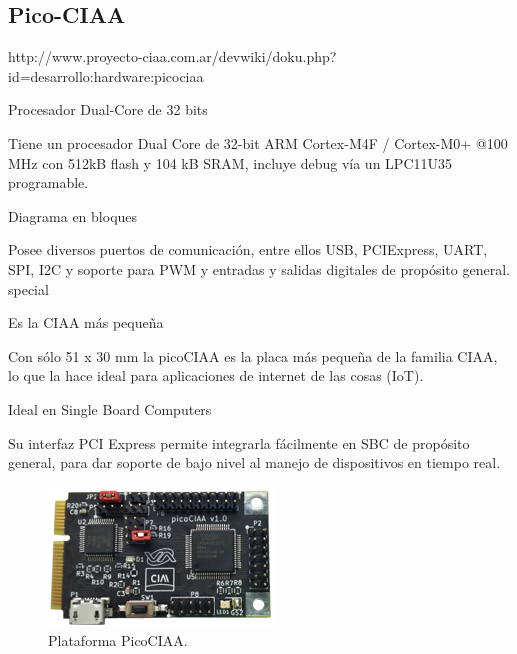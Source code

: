 \medskip 



\subsection{Pico-CIAA}

http://www.proyecto-ciaa.com.ar/devwiki/doku.php?id=desarrollo:hardware:picociaa

Procesador Dual-Core de 32 bits

Tiene un procesador Dual Core de 32-bit ARM Cortex-M4F / Cortex-M0+ @100 MHz con 512kB flash y 104 kB SRAM, incluye debug vía un LPC11U35 programable.

Diagrama en bloques

Posee diversos puertos de comunicación, entre ellos USB, PCIExpress, UART, SPI, I2C y soporte para PWM y entradas y salidas digitales de propósito general.
special

Es la CIAA más pequeña

Con sólo 51 x 30 mm la picoCIAA es la placa más pequeña de la familia CIAA,
lo que la hace ideal para aplicaciones de internet de las cosas (IoT).

Ideal en Single Board Computers

Su interfaz PCI Express permite integrarla fácilmente en SBC de propósito general, para dar soporte de bajo nivel al manejo de dispositivos en tiempo real.

\begin{figure}[!htbp]
\begin{center}  %
\includegraphics*[width=\textwidth]{Figures/PicoCIAA_Foto.png}
\par\caption{Plataforma PicoCIAA.}\label{fig:picoCiaa}
\end{center}
\end{figure}

